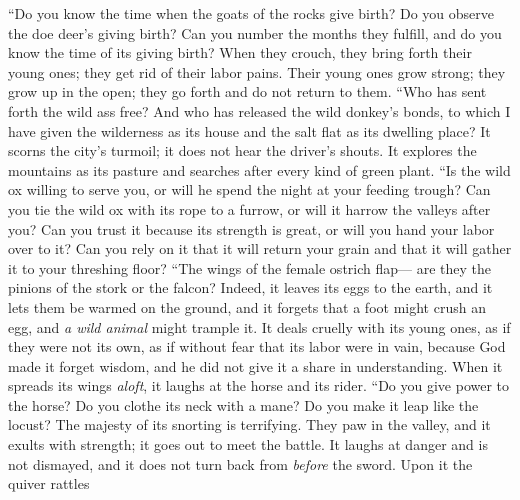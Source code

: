 \begin{biblechapter} %
\verse “Do you know the time when the goats of the rocks give birth? 
Do you observe the doe deer’s giving birth?
\verse Can you number the months they fulfill, 
and do you know the time of its giving birth?
\verse When they crouch, they bring forth their young ones; 
they get rid of their labor pains.
\verse Their young ones grow strong; they grow up in the open; 
they go forth and do not return to them.
\verse “Who has sent forth the wild ass free? 
And who has released the wild donkey’s bonds,
\verse to which I have given the wilderness as its house 
and the salt flat as its dwelling place?
\verse It scorns the city’s turmoil; 
it does not hear the driver’s shouts.
\verse It explores the mountains as its pasture 
and searches after every kind of green plant.
\verse “Is the wild ox willing to serve you, 
or will he spend the night at your feeding trough?
\verse Can you tie the wild ox with its rope to a furrow, 
or will it harrow the valleys after you?
\verse Can you trust it because its strength is great, 
or will you hand your labor over to it?
\verse Can you rely on it that it will return your grain 
and that it will gather it to your threshing floor?
\verse “The wings of the female ostrich flap— 
are they the pinions of the stork or the falcon?
\verse Indeed, it leaves its eggs to the earth, 
and it lets them be warmed on the ground,
\verse and it forgets that a foot might crush an egg, 
and \textit{a wild animal} might trample it.
\verse It deals cruelly with its young ones, as if they were not its own, 
as if without fear that its labor were in vain,
\verse because God made it forget wisdom, 
and he did not give it a share in understanding.
\verse When it spreads its wings \textit{aloft}, 
it laughs at the horse and its rider.
\verse “Do you give power to the horse? 
Do you clothe its neck with a mane?
\verse Do you make it leap like the locust? 
The majesty of its snorting is terrifying.
\verse They paw in the valley, and it exults with strength; 
it goes out to meet the battle.
\verse It laughs at danger and is not dismayed, 
and it does not turn back from \textit{before} the sword.
\verse Upon it the quiver rattles 

\end{biblechapter}
